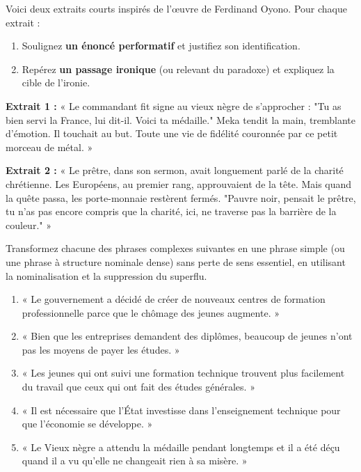 \documentclass[11pt]{article}
\newcounter{popsec}
\newcounter{popsub}
\newcommand{\courssub}[1]{%
  \stepcounter{popsub}%
  \par\vspace{9pt}\noindent{\popxbold\fontsize{11.5}{13}\selectfont\color{popink}{\color{poporange}\thepopsec.\thepopsub}\hspace{6pt}#1}\par\nopagebreak\vspace{4pt}
}
\begin{document}
\courssub{Je m'entraîne}

\begin{exercice}
Voici deux extraits courts inspirés de l'œuvre de Ferdinand Oyono. Pour chaque extrait :
\begin{enumerate}
    \item Soulignez \textbf{un énoncé performatif} et justifiez son identification.
    \item Repérez \textbf{un passage ironique} (ou relevant du paradoxe) et expliquez la cible de l'ironie.
\end{enumerate}
\textbf{Extrait 1 :} « Le commandant fit signe au vieux nègre de s'approcher : "Tu as bien servi la France, lui dit-il. Voici ta médaille." Meka tendit la main, tremblante d'émotion. Il touchait au but. Toute une vie de fidélité couronnée par ce petit morceau de métal. »

\textbf{Extrait 2 :} « Le prêtre, dans son sermon, avait longuement parlé de la charité chrétienne. Les Européens, au premier rang, approuvaient de la tête. Mais quand la quête passa, les porte-monnaie restèrent fermés. "Pauvre noir, pensait le prêtre, tu n'as pas encore compris que la charité, ici, ne traverse pas la barrière de la couleur." »
\end{exercice}

\begin{exercice}
Transformez chacune des phrases complexes suivantes en une phrase simple (ou une phrase à structure nominale dense) sans perte de sens essentiel, en utilisant la nominalisation et la suppression du superflu.
\begin{enumerate}
    \item « Le gouvernement a décidé de créer de nouveaux centres de formation professionnelle parce que le chômage des jeunes augmente. »
    \item « Bien que les entreprises demandent des diplômes, beaucoup de jeunes n'ont pas les moyens de payer les études. »
    \item « Les jeunes qui ont suivi une formation technique trouvent plus facilement du travail que ceux qui ont fait des études générales. »
    \item « Il est nécessaire que l'État investisse dans l'enseignement technique pour que l'économie se développe. »
    \item « Le Vieux nègre a attendu la médaille pendant longtemps et il a été déçu quand il a vu qu'elle ne changeait rien à sa misère. »
\end{enumerate}
\end{exercice}
\end{document}
